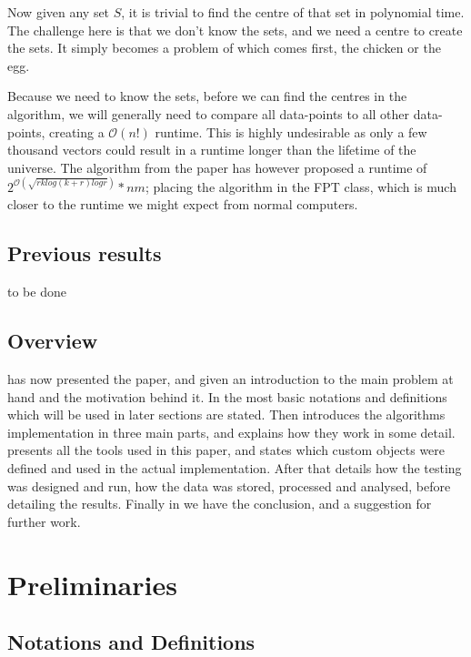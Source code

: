 \documentclass[a4paper]{article}
\begin{document}
Now given any set $S$, it is trivial to find the centre of that set in polynomial time. The challenge
here is that we don't know the sets, and we need a centre to create the sets. It simply becomes a problem
of which comes first, the chicken or the egg.

Because we need to know the sets, before we can find the centres in the algorithm, we will
generally need to compare all data-points to all other data-points, creating a $\mathcal{O}(n!)$ runtime. This
is highly undesirable as only a few thousand vectors could result in a runtime longer than the lifetime
of the universe. The algorithm from the paper \cite{fomin_golovach_panolan_2020} has however proposed a
runtime of $2^{\mathcal{O} (\sqrt{rk log(k+r) logr})}*nm$; placing the algorithm in the FPT class, which is
much closer to the runtime we might expect from normal computers.

\subsection{Previous results}
to be done

\subsection{Overview}
 has now presented the paper, and given an introduction to the main problem at hand and the
motivation behind it. In  the most basic notations and definitions which will be used in
later sections are stated. Then  introduces the algorithms implementation in three main parts, and
explains how they work in some detail.  presents all the tools used in this paper, and states which
custom objects were defined and used in the actual implementation. After that  details how the
testing was designed and run, how the data was stored, processed and analysed, before detailing the results. Finally
in  we have the conclusion, and a suggestion for further work.

%
%

\newpage

\section{Preliminaries}
\label{sec:prelim}
\subsection{Notations and Definitions}
\end{document}
